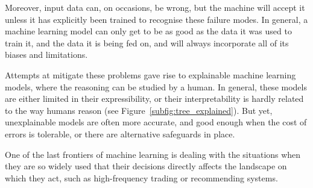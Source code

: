 Moreover, input data can, on occasions, be wrong, but the machine will accept it unless it has explicitly been trained to recognise these failure modes.
In general, a machine learning model can only get to be as good as the data it was used to train it, and the data it is being fed on, and will always incorporate all of its biases and limitations.


Attempts at mitigate these problems gave rise to explainable machine learning models, where the reasoning can be studied by a human.
In general, these models are either limited in their expressibility, or their interpretability is hardly related to the way humans reason (see Figure~\ref{subfig:tree_explained}).
But yet, unexplainable models are often more accurate, and good enough when the cost of errors is tolerable, or there are alternative safeguards in place.

One of the last frontiers of machine learning is dealing with the situations when they are so widely used that their decisions directly affects the landscape on which they act, such as high-frequency trading or recommending systems.
